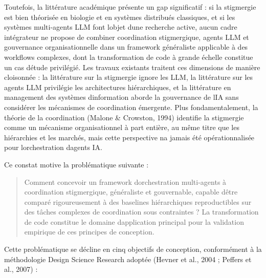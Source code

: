 Toutefois, la littérature académique présente un gap significatif : si
la stigmergie est bien théorisée en biologie et en systèmes distribués
classiques, et si les systèmes multi-agents LLM font
l\textquotesingle objet d\textquotesingle une recherche active, aucun
cadre intégrateur ne propose de combiner coordination stigmergique,
agents LLM et gouvernance organisationnelle dans un framework
généraliste applicable à des workflows complexes, dont la transformation
de code à grande échelle constitue un cas d\textquotesingle étude
privilégié. Les travaux existants traitent ces dimensions de
manière cloisonnée : la littérature sur la stigmergie ignore les LLM, la
littérature sur les agents LLM privilégie les architectures
hiérarchiques, et la littérature en management des systèmes
d\textquotesingle information aborde la gouvernance de
l\textquotesingle IA sans considérer les mécanismes de coordination
émergente. Plus fondamentalement, la théorie de la coordination
(Malone \& Crowston, 1994) identifie la stigmergie comme un mécanisme
organisationnel à part entière, au même titre que les hiérarchies et les
marchés, mais cette perspective n\textquotesingle a jamais été
opérationnalisée pour l\textquotesingle orchestration d\textquotesingle agents IA.

Ce constat motive la problématique suivante :

\begin{quote}
Comment concevoir un framework d\textquotesingle orchestration
multi-agents à coordination stigmergique, généraliste et gouvernable,
capable d\textquotesingle être comparé rigoureusement à des baselines
hiérarchiques reproductibles sur des tâches complexes de coordination
sous contraintes ?
La transformation de code constitue le domaine
d\textquotesingle application principal pour la validation empirique de
ces principes de conception.
\end{quote}

Cette problématique se décline en cinq objectifs de conception,
conformément à la méthodologie Design Science Research adoptée
(Hevner et al., 2004 ; Peffers et al., 2007) :

